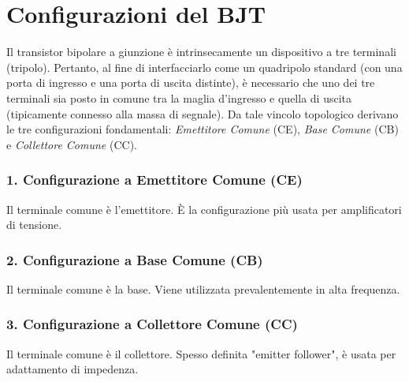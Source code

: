 \section{Configurazioni del BJT}
Il transistor bipolare a giunzione è intrinsecamente un dispositivo a tre terminali (tripolo). Pertanto, al fine di interfacciarlo come un quadripolo standard (con una porta di ingresso e una porta di uscita distinte), è necessario che uno dei tre terminali sia posto in comune tra la maglia d'ingresso e quella di uscita (tipicamente connesso alla massa di segnale). 
Da tale vincolo topologico derivano le tre configurazioni fondamentali: \emph{Emettitore Comune} (CE), \emph{Base Comune} (CB) e \emph{Collettore Comune} (CC).

\subsubsection*{1. Configurazione a Emettitore Comune (CE)}
Il terminale comune è l'emettitore. È la configurazione più usata per amplificatori di tensione.

\subsubsection*{2. Configurazione a Base Comune (CB)}
Il terminale comune è la base. Viene utilizzata prevalentemente in alta frequenza.

\subsubsection*{3. Configurazione a Collettore Comune (CC)}
Il terminale comune è il collettore. Spesso definita "emitter follower", è usata per adattamento di impedenza.

